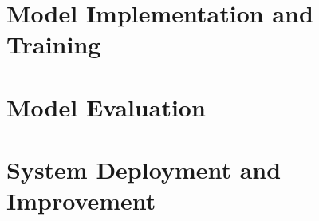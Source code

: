 \documentclass[a4paper, 12pt, oneside]{book}
\begin{document}
\chapter{Model Implementation and Training}\label{chap:Implementation}


%

\chapter{Model Evaluation}\label{chap:Evaluation}
%
%


\chapter{System Deployment and Improvement}\label{chap:final-application}



%
\cleardoublepage
{}
\setcounter{page}{\thesavepage}
\printbibliography[heading=bibintoc,title={References}]
\clearpage
\end{document}
